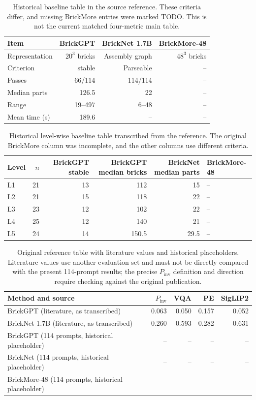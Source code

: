 \begin{table}[!htbp]\centering\small
\begin{tabular}{lrrr}\toprule
Item & BrickGPT & BrickNet 1.7B & BrickMore-48 \\ \midrule
Representation & $20^3$ bricks & Assembly graph & $48^3$ bricks \\
Criterion & stable & Parseable & -- \\
Passes & 66/114 & 114/114 & -- \\
Median parts & 126.5 & 22 & -- \\
Range & 19--497 & 6--48 & -- \\
Mean time (s) & 189.6 & -- & -- \\
\bottomrule\end{tabular}
\caption{Historical baseline table in the source reference. These criteria differ, and missing BrickMore entries were marked TODO. This is not the current matched four-metric main table.}
\end{table}

\begin{table}[!htbp]\centering\small
\begin{tabular}{lrrrrl}\toprule
Level & $n$ & BrickGPT stable & BrickGPT median bricks & BrickNet median parts & BrickMore-48 \\ \midrule
L1 & 21 & 13 & 112 & 15 & -- \\
L2 & 21 & 15 & 118 & 22 & -- \\
L3 & 23 & 12 & 102 & 22 & -- \\
L4 & 25 & 12 & 140 & 21 & -- \\
L5 & 24 & 14 & 150.5 & 29.5 & -- \\
\bottomrule\end{tabular}
\caption{Historical level-wise baseline table transcribed from the reference. The original BrickMore column was incomplete, and the other columns use different criteria.}
\end{table}

\begin{table}[!htbp]\centering\small
\begin{tabular}{lrrrr}\toprule
Method and source & $P_{\mathrm{inv}}$ & VQA & PE & SigLIP2 \\ \midrule
BrickGPT (literature, as transcribed) & 0.063 & 0.050 & 0.157 & 0.052 \\
BrickNet 1.7B (literature, as transcribed) & 0.260 & 0.593 & 0.282 & 0.631 \\
BrickGPT (114 prompts, historical placeholder) & -- & -- & -- & -- \\
BrickNet (114 prompts, historical placeholder) & -- & -- & -- & -- \\
BrickMore-48 (114 prompts, historical placeholder) & -- & -- & -- & -- \\
\bottomrule\end{tabular}
\caption{Original reference table with literature values and historical placeholders. Literature values use another evaluation set and must not be directly compared with the present 114-prompt results; the precise $P_{\mathrm{inv}}$ definition and direction require checking against the original publication.}
\end{table}


